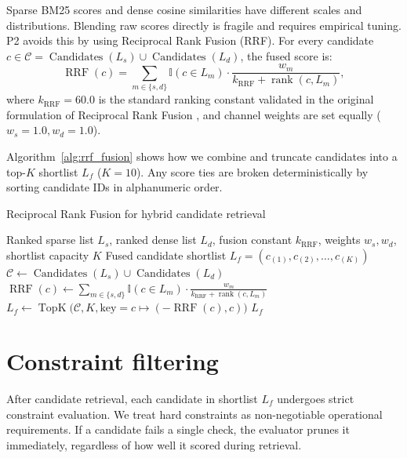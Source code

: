 Sparse BM25 scores and dense cosine similarities have different scales and distributions. Blending raw scores directly is fragile and requires empirical tuning. P2 avoids this by using Reciprocal Rank Fusion (RRF). For every candidate $c \in \mathcal{C} = \operatorname{Candidates}(L_s) \cup \operatorname{Candidates}(L_d)$, the fused score is:
\[
\operatorname{RRF}(c) = \sum_{m \in \{s, d\}} \mathbb{I}(c \in L_m) \cdot \frac{w_m}{k_{\mathrm{RRF}} + \operatorname{rank}(c, L_m)},
\]
where $k_{\mathrm{RRF}} = 60.0$ is the standard ranking constant validated in the original formulation of Reciprocal Rank Fusion \cite{rrf}, and channel weights are set equally ($w_s = 1.0, w_d = 1.0$).

Algorithm~\ref{alg:rrf_fusion} shows how we combine and truncate candidates into a top-$K$ shortlist $L_f$ ($K = 10$). Any score ties are broken deterministically by sorting candidate IDs in alphanumeric order.

\begin{algorithm}[ht]{Reciprocal Rank Fusion for hybrid candidate retrieval}
\label{alg:rrf_fusion}
\begin{algorithmic}[1]
\Require Ranked sparse list $L_s$, ranked dense list $L_d$, fusion constant $k_{\mathrm{RRF}}$, weights $w_s, w_d$, shortlist capacity $K$
\Ensure Fused candidate shortlist $L_f = (c_{(1)}, c_{(2)}, \dots, c_{(K)})$
\State $\mathcal{C} \gets \operatorname{Candidates}(L_s) \cup \operatorname{Candidates}(L_d)$
    \State $\operatorname{RRF}(c) \gets \sum_{m \in \{s, d\}} \mathbb{I}(c \in L_m) \cdot \frac{w_m}{k_{\mathrm{RRF}} + \operatorname{rank}(c, L_m)}$
\EndFor
\State $L_f \gets \operatorname{TopK}\Big(\mathcal{C}, K, \text{key} = c \mapsto (-\operatorname{RRF}(c), c)\Big)$ 
\State \Return $L_f$
\end{algorithmic}
\end{algorithm}

\section{Constraint filtering}

After candidate retrieval, each candidate in shortlist $L_f$ undergoes strict constraint evaluation. We treat hard constraints as non-negotiable operational requirements. If a candidate fails a single check, the evaluator prunes it immediately, regardless of how well it scored during retrieval.

